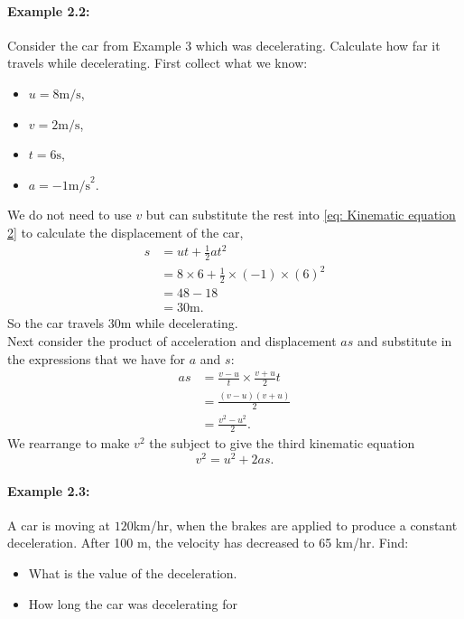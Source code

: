 \paragraph{Example 2.2:} Consider the car from Example 3 which was decelerating. Calculate how far it travels while decelerating. 
First collect what we know:
\begin{itemize}
\setlength{\itemsep}{-5pt}
    \item $u=8\text{m/s}$,
    \item $v=2\text{m/s}$,
    \item $t=6\text{s}$,
    \item $a=-1\text{m/s}^{2}$.
\end{itemize}
We do not need to use $v$ but can substitute the rest into \cref{eq: Kinematic equation 2} to calculate the displacement of the car,
\begin{align*}
    s&=ut+\frac{1}{2}at^{2}\\
     &=8\times 6 +\frac{1}{2}\times \left(-1\right)\times \left(6\right)^{2}\\
     &=48-18\\
     &=30\text{m}.
\end{align*}
So the car travels $30\text{m}$ while decelerating.\\

Next consider the product of acceleration and displacement $as$ and substitute in the expressions that we have for $a$ and $s$:
\begin{align*}
    as  &=\frac{v-u}{t}\times \frac{v+u}{2}t\\
        &=\frac{(v-u)(v+u)}{2}\\
        &=\frac{v^{2}-u^{2}}{2}.
\end{align*}
We rearrange to make $v^{2}$ the subject to give the third kinematic equation
\begin{equation}
    v^{2}=u^{2}+2as.
    \label{eq: Kinematic equation 3}
\end{equation}

\paragraph{Example 2.3:} A car is moving at $120 $km/hr, when the brakes are applied to produce a constant deceleration. After 100 m, the velocity has decreased to 65 km/hr. Find:
\begin{itemize}
\setlength{\itemsep}{-5pt}
    \item[a)] What is the value of the deceleration.
    \item[b)] How long the car was decelerating for
\end{itemize}

